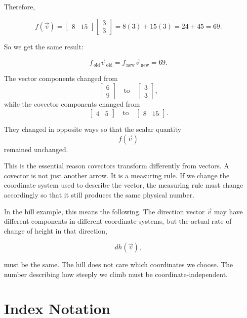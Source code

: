 \documentclass[11pt,openany]{book}
\theoremstyle{definition}
\begin{document}
Therefore,

\[
f(\vec{v})
=
\begin{bmatrix}
8 & 15
\end{bmatrix}
\begin{bmatrix}
3 \\
3
\end{bmatrix}
=
8(3)+15(3)
=
24+45
=
69.
\]

So we get the same result:

\[
f_{\,\text{old}}\vec{v}_{\,\text{old}}
=
f_{\,\text{new}}\vec{v}_{\,\text{new}}
=
69.
\]

\begin{keyidea}
The vector components changed from
\[
\begin{bmatrix}
6 \\
9
\end{bmatrix}
\quad \text{to} \quad
\begin{bmatrix}
3 \\
3
\end{bmatrix},
\]
while the covector components changed from
\[
\begin{bmatrix}
4 & 5
\end{bmatrix}
\quad \text{to} \quad
\begin{bmatrix}
8 & 15
\end{bmatrix}.
\]

They changed in opposite ways so that the scalar quantity
\[
f(\vec{v})
\]
remained unchanged.
\end{keyidea}

\medskip

This is the essential reason covectors transform differently from vectors. A
covector is not just another arrow. It is a measuring rule. If we change the
coordinate system used to describe the vector, the measuring rule must change
accordingly so that it still produces the same physical number.

\medskip

In the hill example, this means the following. The direction vector
\(\vec{v}\) may have different components in different coordinate systems, but
the actual rate of change of height in that direction,

\[
dh(\vec{v}),
\]

must be the same. The hill does not care which coordinates we choose. The
number describing how steeply we climb must be coordinate-independent.

\section{Index Notation}
\end{document}
